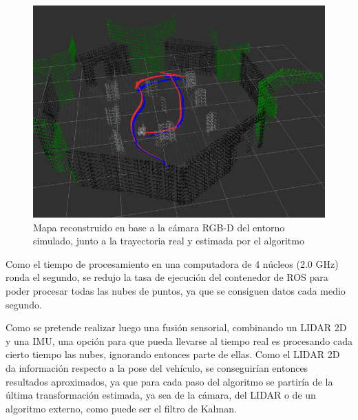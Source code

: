 \begin{figure}[!ht]
    \centering
    \includegraphics[width=\linewidth]{Img/TurtleBotWorldMap3DEstimated.png}%
    \caption{Mapa reconstruido en base a la cámara RGB-D del entorno simulado, junto a la trayectoria real y estimada por el algoritmo}
    \label{fig:turtlebotworldestimatedmap}
\end{figure}
Como el tiempo de procesamiento en una computadora de 4 núcleos (2.0 GHz) ronda el segundo, se redujo la tasa de ejecución del contenedor de ROS para poder procesar todas las nubes de puntos, ya que se consiguen datos cada medio segundo. 


Como se pretende realizar luego una fusión sensorial, combinando un LIDAR 2D y una IMU, una opción para que pueda llevarse al tiempo real es procesando cada cierto tiempo las nubes, ignorando entonces parte de ellas. Como el LIDAR 2D da información respecto a la pose del vehículo, se conseguirían entonces resultados aproximados, ya que para cada paso del algoritmo se partiría de la última transformación estimada, ya sea de la cámara, del LIDAR o de un algoritmo externo, como puede ser el filtro de Kalman.